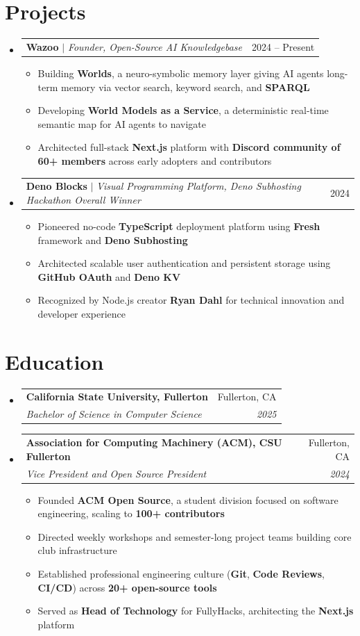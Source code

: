 \documentclass[letterpaper,11pt]{article}
\makeatletter
\newcommand{\resumeItem}[1]{
  \item\small{
    {#1 \vspace{-2pt}}
  }
}
\newcommand{\resumeSubheading}[4]{
  \vspace{-2pt}\item
    \begin{tabular*}{0.97\textwidth}[t]{l@{\extracolsep{\fill}}r}
      \textbf{#1} & #2 \\
      \textit{\small#3} & \textit{\small #4} \\
    \end{tabular*}\vspace{-7pt}
}
\newcommand{\resumeProjectHeading}[2]{
    \item
    \begin{tabular*}{0.97\textwidth}{l@{\extracolsep{\fill}}r}
      \small#1 & #2 \\
    \end{tabular*}\vspace{-7pt}
}
\newcommand{\resumeSubHeadingListStart}{\begin{itemize}[leftmargin=0.15in, label={}]}
\newcommand{\resumeSubHeadingListEnd}{\end{itemize}}
\newcommand{\resumeItemListStart}{\begin{itemize}}
\newcommand{\resumeItemListEnd}{\end{itemize}\vspace{-5pt}}
\makeatother
\begin{document}
\section{Projects}
\resumeSubHeadingListStart
  \resumeProjectHeading
    {\textbf{Wazoo} $|$ \emph{Founder, Open-Source AI Knowledgebase}}{2024 -- Present}
    \resumeItemListStart
      \resumeItem{Building \textbf{Worlds}, a neuro-symbolic memory layer giving AI agents long-term memory via vector search, keyword search, and \textbf{SPARQL}}
      \resumeItem{Developing \textbf{World Models as a Service}, a deterministic real-time semantic map for AI agents to navigate}
      \resumeItem{Architected full-stack \textbf{Next.js} platform with \textbf{Discord community of 60+ members} across early adopters and contributors}
    \resumeItemListEnd

  \resumeProjectHeading
    {\textbf{Deno Blocks} $|$ \emph{Visual Programming Platform, Deno Subhosting Hackathon Overall Winner}}{2024}
    \resumeItemListStart
      \resumeItem{Pioneered no-code \textbf{TypeScript} deployment platform using \textbf{Fresh} framework and \textbf{Deno Subhosting}}
      \resumeItem{Architected scalable user authentication and persistent storage using \textbf{GitHub OAuth} and \textbf{Deno KV}}
      \resumeItem{Recognized by Node.js creator \textbf{Ryan Dahl} for technical innovation and developer experience}
    \resumeItemListEnd
  \resumeSubHeadingListEnd

\section{Education}
\resumeSubHeadingListStart
  \resumeSubheading
    {California State University, Fullerton}{Fullerton, CA}
    {Bachelor of Science in Computer Science}{2025}
  
  \vspace{4pt}

  \resumeSubheading
    {Association for Computing Machinery (ACM), CSU Fullerton}{Fullerton, CA}
    {Vice President and Open Source President}{2024}
    
    \resumeItemListStart
      \resumeItem{Founded \textbf{ACM Open Source}, a student division focused on software engineering, scaling to \textbf{100+ contributors}}
      \resumeItem{Directed weekly workshops and semester-long project teams building core club infrastructure}
      \resumeItem{Established professional engineering culture (\textbf{Git}, \textbf{Code Reviews}, \textbf{CI/CD}) across \textbf{20+ open-source tools}}
      \resumeItem{Served as \textbf{Head of Technology} for FullyHacks, architecting the \textbf{Next.js} platform}
    \resumeItemListEnd
\resumeSubHeadingListEnd
\end{document}
